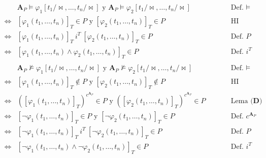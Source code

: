 \documentclass{article}
\begin{document}
\begin{enumerate}
\begin{itemize}
\begin{itemize}
                        \begin{equation*}
                          \begin{alignedat}{2}
                                 & \mathbf{A}_P\vDash\varphi_1[t_1/\!\bowtie,\dots,t_n/\!\bowtie]\text{ y } \mathbf{A}_P\vDash\varphi_2[t_1/\!\bowtie,\dots,t_n/\!\bowtie]   &  & \qquad\text{Def. }\vDash           \\
                            \iff & [\varphi_1(t_1,\dots,t_n)]_T\in P\text{ y }[\varphi_2(t_1,\dots,t_n)]_T\in P                                                              &  & \qquad\text{HI}                    \\
                            \iff & [\varphi_1(t_1,\dots,t_n)]_T\ i^T\ [\varphi_2(t_1,\dots,t_n)]_T\in P                                                                      &  & \qquad\text{Def. }P                \\
                            \iff & [\varphi_1(t_1,\dots,t_n)\land\varphi_2(t_1,\dots,t_n)]_T\in P                                                                            &  & \qquad\text{Def. }i^T              \\
                            \\
                                 & \mathbf{A}_P\nvDash\varphi_1[t_1/\!\bowtie,\dots,t_n/\!\bowtie]\text{ y } \mathbf{A}_P\nvDash\varphi_2[t_1/\!\bowtie,\dots,t_n/\!\bowtie] &  & \qquad\text{Def. }\vDash           \\
                            \iff & [\varphi_1(t_1,\dots,t_n)]_T\notin P\text{ y }[\varphi_2(t_1,\dots,t_n)]_T\notin P                                                        &  & \qquad\text{HI}                    \\
                            \iff & ([\varphi_1(t_1,\dots,t_n)]_T)^{c^{\mathbf{A}_P}}\in P\text{ y }([\varphi_2(t_1,\dots,t_n)]_T)^{c^{\mathbf{A}_P}}\in P                    &  & \qquad\text{Lema }\textbf{(D)}     \\
                            \iff & [\neg\varphi_1(t_1,\dots,t_n)]_T\in P\text{ y }[\neg\varphi_2(t_1,\dots,t_n)]_T\in P                                                      &  & \qquad\text{Def. }c^{\mathbf{A}_P} \\
                            \iff & [\neg\varphi_1(t_1,\dots,t_n)]_T\ i^T\ [\neg\varphi_2(t_1,\dots,t_n)]_T\in P                                                              &  & \qquad\text{Def. }P                \\
                            \iff & [\neg\varphi_1(t_1,\dots,t_n)\land\neg\varphi_2(t_1,\dots,t_n)]_T\in P                                                                    &  & \qquad\text{Def. }i^T              \\

\end{alignedat}
\end{equation*}
\end{itemize}
\end{itemize}
\end{enumerate}
\end{document}
